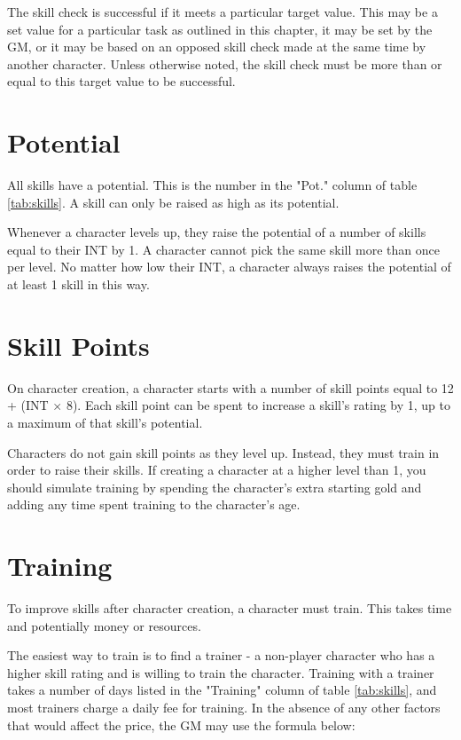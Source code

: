 \begin{multicols}{2}
    The skill check is successful if it meets a particular target value. This
    may be a set value for a particular task as outlined in this chapter, it
    may be set by the GM, or it may be based on an opposed skill check made at
    the same time by another character. Unless otherwise noted, the skill
    check must be more than or equal to this target value to be successful.

    \section{Potential}
    All skills have a potential. This is the number in the "Pot."
    column of table \ref{tab:skills}. A skill can only be raised as high as
    its potential.

    Whenever a character levels up, they raise the potential of a number of
    skills equal to their INT by 1. A character cannot pick the same skill more
    than once per level. No matter how low their INT, a character always raises
    the potential of at least 1 skill in this way.

    \section{Skill Points}
    On character creation, a character starts with a number of skill points
    equal to 12 + (INT $\times$ 8). Each skill point can be spent to increase
    a skill's rating by 1, up to a maximum of that skill's potential.

    Characters do not gain skill points as they level up. Instead, they must
    train in order to raise their skills. If creating a character at a higher
    level than 1, you should simulate training by spending the character's
    extra starting gold and adding any time spent training to the character's
    age.

    \section{Training}
    To improve skills after character creation, a character must train. This
    takes time and potentially money or resources.

    The easiest way to train is to find a trainer - a non-player character
    who has a higher skill rating and is willing to train the character.
    Training with a trainer takes a number of days listed in the "Training"
    column of table \ref{tab:skills}, and most trainers charge a daily fee
    for training. In the absence of any other factors that would affect the
    price, the GM may use the formula below:


\end{multicols}
